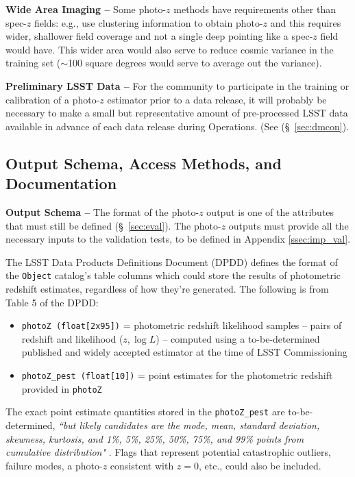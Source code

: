 \documentclass[DM,authoryear,toc]{lsstdoc}
\begin{document}
{\bf Wide Area Imaging --} 
Some photo-$z$ methods have requirements other than spec-$z$ fields: e.g., \citet{2019MNRAS.483.2801S} use clustering information to obtain photo-$z$ and this requires wider, shallower field coverage and not a single deep pointing like a spec-$z$ field would have. 
This wider area would also serve to reduce cosmic variance in the training set ($\sim$100 square degrees would serve to average out the variance).

{\bf Preliminary LSST Data --}
For the community to participate in the training or calibration of a photo-$z$ estimator prior to a data release, it will probably be necessary to make a small but representative amount of pre-processed LSST data available in advance of each data release during Operations. (See (\S~\ref{sec:dmcon}).

\subsection{Output Schema, Access Methods, and Documentation}\label{ssec:dp_pz}

{\bf Output Schema --} 
The format of the photo-$z$ output is one of the attributes that must still be defined (\S~\ref{sec:eval}). 
The photo-$z$ outputs must provide all the necessary inputs to the validation tests, to be defined in Appendix \ref{ssec:imp_val}.

The LSST Data Products Definitions Document (DPDD)  defines the format of the {\tt Object} catalog's table columns which could store the results of photometric redshift estimates, regardless of how they're generated. 
The following is from Table 5 of the DPDD:
\vspace{-15pt}
\begin{itemize}
\item \texttt{photoZ (float[2x95])} = photometric redshift likelihood samples -- pairs of redshift and likelihood ($z,\log{L}$) -- computed using a to-be-determined published and widely accepted estimator at the time of LSST Commissioning
\item \texttt{photoZ\_pest (float[10])} = point estimates for the photometric redshift provided in {\tt photoZ}
\end{itemize}

The exact point estimate quantities stored in the \texttt{photoZ\_pest} are to-be-determined, {\it ``but likely candidates are the mode, mean, standard deviation, skewness, kurtosis, and 1\%, 5\%, 25\%, 50\%, 75\%, and 99\% points from cumulative distribution"} . 
Flags that represent potential catastrophic outliers, failure modes, a photo-$z$ consistent with $z=0$, etc., could also be included.
\end{document}
